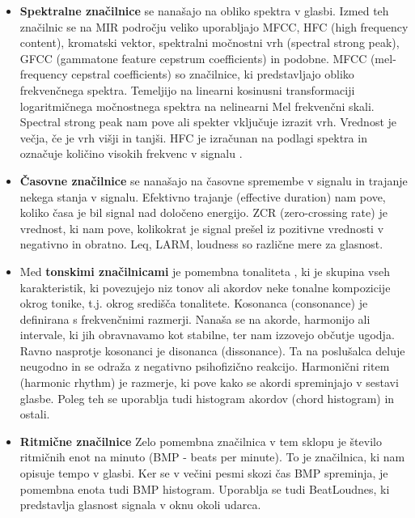 \documentclass[a4paper, 12pt]{book}
\begin{document}
{\begin{itemize}
  \item \textbf{Spektralne značilnice} se nanašajo na obliko spektra v glasbi. Izmed teh značilnic se na MIR področju veliko uporabljajo MFCC, HFC (high frequency content), kromatski vektor, spektralni močnostni vrh (spectral strong peak), GFCC (gammatone feature cepstrum coefficients) in podobne. 
MFCC (mel-frequency cepstral coefficients) \cite{lawrence2008fundamentals} so značilnice, ki predstavljajo obliko frekvenčnega spektra. Temeljijo na linearni kosinusni transformaciji logaritmičnega močnostnega spektra na nelinearni Mel frekvenčni skali. Spectral strong peak \cite{gouyon2001exploration} nam pove ali spekter vključuje izrazit vrh. Vrednost je večja, če je vrh višji in tanjši. HFC je izračunan na podlagi spektra in označuje količino visokih frekvenc v signalu \cite{brossier2004real}.

  \item \textbf{Časovne značilnice} se nanašajo na časovne spremembe v signalu in trajanje nekega stanja v signalu. Efektivno trajanje (effective duration) nam pove, koliko časa je bil signal nad določeno energijo. ZCR (zero-crossing rate) \cite{gouyon2000classifying} je vrednost, ki nam pove, kolikokrat je signal prešel iz pozitivne vrednosti v negativno in obratno. Leq, LARM, loudness so različne mere za glasnost. 
  
  \item Med \textbf{tonskimi značilnicami} je pomembna tonaliteta \cite{zhu2005music}, ki je skupina vseh karakteristik, ki povezujejo niz tonov ali akordov neke tonalne kompozicije okrog tonike, t.j. okrog središča tonalitete. Kosonanca  (consonance) \cite{terhardt1974pitch} je definirana s frekvenčnimi razmerji. Nanaša se na akorde, harmonijo ali intervale, ki jih obravnavamo kot stabilne, ter nam izzovejo občutje ugodja. Ravno nasprotje kosonanci je disonanca (dissonance). Ta na poslušalca deluje neugodno in se odraža z negativno psihofizično reakcijo. Harmonični ritem (harmonic rhythm) \cite{la2001harmonic} je razmerje, ki pove kako se akordi spreminjajo v sestavi glasbe. Poleg teh se uporablja tudi histogram akordov (chord histogram) in ostali.
  
  \item \textbf{Ritmične značilnice} Zelo pomembna značilnica v tem sklopu je število ritmičnih enot na minuto (BMP - beats per minute). To je značilnica, ki nam opisuje tempo v glasbi. Ker se v večini pesmi skozi čas BMP spreminja, je pomembna enota tudi BMP histogram. Uporablja se tudi BeatLoudnes, ki predstavlja glasnost signala v oknu okoli udarca. 
  

\end{itemize}}
\end{document}
